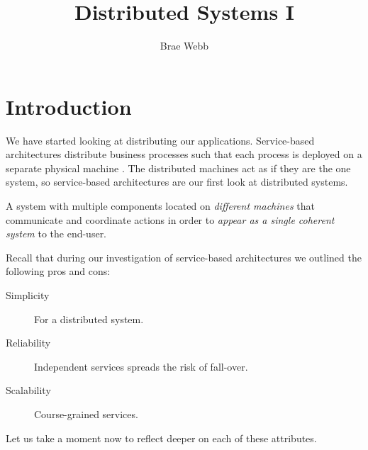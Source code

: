 \title{Distributed Systems I}
\author{Brae Webb}
\date{}

\maketitle

\section{Introduction}
We have started looking at distributing our applications.
Service-based architectures distribute business processes such that each process is deployed on a separate physical machine \cite{service-based-notes}.
The distributed machines act as if they are the one system,
so service-based architectures are our first look at distributed systems.

\begin{definition}
A system with multiple components located on \textsl{different machines} that communicate and coordinate actions in order to \textsl{appear as a single coherent system} to the end-user.
\end{definition}

\noindent Recall that during our investigation of service-based architectures we outlined the following pros and cons:
\begin{description}
    \item[Simplicity] For a distributed system.
    \item[Reliability] Independent services spreads the risk of fall-over.
    \item[Scalability] Course-grained services.
\end{description}

\noindent Let us take a moment now to reflect deeper on each of these attributes.

